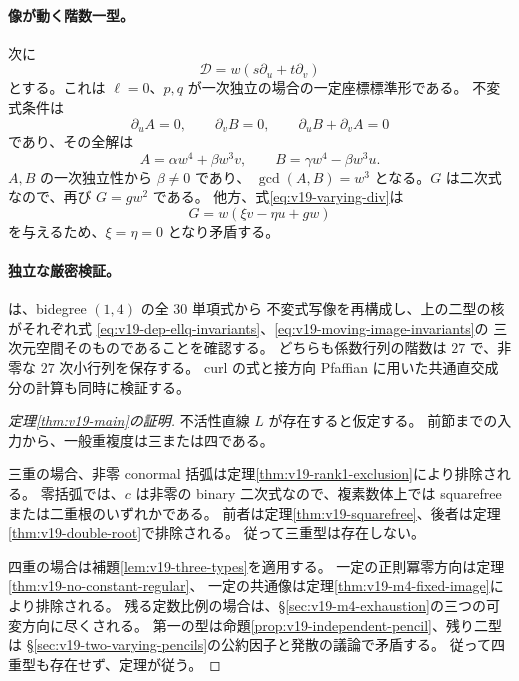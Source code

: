 \documentclass[11pt,a4paper]{ltjsarticle}
\theoremstyle{remark}\newtheorem{remark}[theorem]{注意}
\begin{document}
\paragraph{像が動く階数一型。}
次に
\[
                  \mathcal D=w(s\partial_u+t\partial_v)
\]
とする。これは $\ell=0$、$p,q$ が一次独立の場合の一定座標標準形である。
不変式条件は
\[
 \partial_uA=0,\qquad\partial_vB=0,
 \qquad\partial_uB+\partial_vA=0
\]
であり、その全解は
\begin{equation}\label{eq:v19-moving-image-invariants}
 A=\alpha w^4+\beta w^3v,
 \qquad B=\gamma w^4-\beta w^3u.
\end{equation}
$A,B$ の一次独立性から $\beta\ne0$ であり、
$\gcd(A,B)=w^3$ となる。$G$ は二次式なので、再び $G=gw^2$ である。
他方、式\eqref{eq:v19-varying-div}は
\[
                    G=w(\xi v-\eta u+gw)
\]
を与えるため、$\xi=\eta=0$ となり矛盾する。

\paragraph{独立な厳密検証。}
 は、bidegree $(1,4)$ の全 $30$ 単項式から
不変式写像を再構成し、上の二型の核がそれぞれ式
\eqref{eq:v19-dep-ellq-invariants}、\eqref{eq:v19-moving-image-invariants}の
三次元空間そのものであることを確認する。
どちらも係数行列の階数は $27$ で、非零な $27$ 次小行列を保存する。
curl の式と接方向 Pfaffian に用いた共通直交成分の計算も同時に検証する。


\begin{proof}[定理\ref{thm:v19-main}の証明]
不活性直線 $L$ が存在すると仮定する。
前節までの入力から、一般重複度は三または四である。

三重の場合、非零 conormal 括弧は定理\ref{thm:v19-rank1-exclusion}により排除される。
零括弧では、$c$ は非零の binary 二次式なので、複素数体上では
squarefree または二重根のいずれかである。
前者は定理\ref{thm:v19-squarefree}、後者は定理\ref{thm:v19-double-root}で排除される。
従って三重型は存在しない。

四重の場合は補題\ref{lem:v19-three-types}を適用する。
一定の正則冪零方向は定理\ref{thm:v19-no-constant-regular}、
一定の共通像は定理\ref{thm:v19-m4-fixed-image}により排除される。
残る定数比例の場合は、\S\ref{sec:v19-m4-exhaustion}の三つの可変方向に尽くされる。
第一の型は命題\ref{prop:v19-independent-pencil}、残り二型は
\S\ref{sec:v19-two-varying-pencils}の公約因子と発散の議論で矛盾する。
従って四重型も存在せず、定理が従う。
\end{proof}
\end{document}
